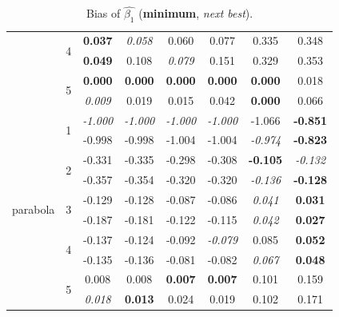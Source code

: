 \documentclass[authoryear, review, 11pt]{elsarticle}
\begin{document}
\begin{table}
\begin{center}
\begin{tabular}{cccccccc}
   \cline{3-8}
   & \multirow{2}{*}{4} & \textbf{0.037} & \emph{0.058} & 0.060 & 0.077 & 0.335 & 0.348 \\ 
   &  & \textbf{0.049} & 0.108 & \emph{0.079} & 0.151 & 0.329 & 0.353 \\ 
   \cline{3-8}
   & \multirow{2}{*}{5} & \textbf{0.000} & \textbf{0.000} & \textbf{0.000} & \textbf{0.000} & \textbf{0.000} & 0.018 \\ 
   &  & \emph{0.009} & 0.019 & 0.015 & 0.042 & \textbf{0.000} & 0.066 \\ 
   \hline
  \multirow{10}{*}{parabola} & \multirow{2}{*}{1} & \emph{-1.000} & \emph{-1.000} & \emph{-1.000} & \emph{-1.000} & -1.066 & \textbf{-0.851} \\ 
   &  & -0.998 & -0.998 & -1.004 & -1.004 & \emph{-0.974} & \textbf{-0.823} \\ 
   \cline{3-8}
   & \multirow{2}{*}{2} & -0.331 & -0.335 & -0.298 & -0.308 & \textbf{-0.105} & \emph{-0.132} \\ 
   &  & -0.357 & -0.354 & -0.320 & -0.320 & \emph{-0.136} & \textbf{-0.128} \\ 
   \cline{3-8}
   & \multirow{2}{*}{3} & -0.129 & -0.128 & -0.087 & -0.086 & \emph{0.041} & \textbf{0.031} \\ 
   &  & -0.187 & -0.181 & -0.122 & -0.115 & \emph{0.042} & \textbf{0.027} \\ 
   \cline{3-8}
   & \multirow{2}{*}{4} & -0.137 & -0.124 & -0.092 & \emph{-0.079} & 0.085 & \textbf{0.052} \\ 
   &  & -0.135 & -0.136 & -0.081 & -0.082 & \emph{0.067} & \textbf{0.048} \\ 
   \cline{3-8}
   & \multirow{2}{*}{5} & 0.008 & 0.008 & \textbf{0.007} & \textbf{0.007} & 0.101 & 0.159 \\ 
   &  & \emph{0.018} & \textbf{0.013} & 0.024 & 0.019 & 0.102 & 0.171 \\ 
  \end{tabular}
\caption{Bias of $\hat{\beta_1}$ (\textbf{minimum}, \emph{next best}).\label{table:X1-bias}}
\end{center}
\end{table}		
\end{document}
